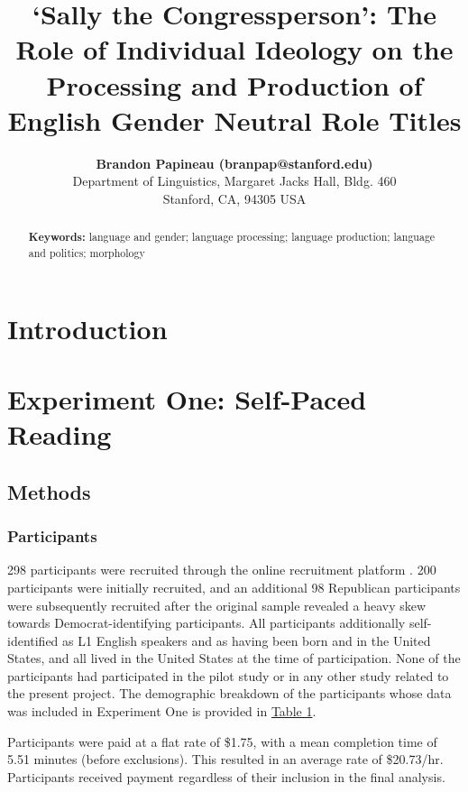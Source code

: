 \documentclass[10pt,letterpaper]{article}
\title{`Sally the Congressperson': The Role of Individual Ideology on the Processing and Production of English Gender Neutral Role Titles}
\author{{\large \bf Brandon Papineau (branpap@stanford.edu)} \\
	Department of Linguistics, Margaret Jacks Hall, Bldg. 460\\
	Stanford, CA, 94305 USA}
\begin{document}
	
	\maketitle
	
	\begin{abstract} 
		
		\textbf{Keywords:} 
		language and gender; language processing; language production; language and politics; morphology
	\end{abstract}
	
	
	\section{Introduction}
	
	\section{Experiment One: Self-Paced Reading}
	\subsection{Methods}
	\subsubsection{Participants}
	298 participants were recruited through the online recruitment platform \textcite{prolific}. 200 participants were initially recruited, and an additional 98 Republican participants were subsequently recruited after the original sample revealed a heavy skew towards Democrat-identifying participants. All participants additionally self-identified as L1 English speakers and as having been born and in the United States, and all lived in the United States at the time of participation. None of the participants had participated in the pilot study or in any other study related to the present project. The demographic breakdown of the participants whose data was included in Experiment One is provided in \hyperref[exp1-sample-table]{Table 1}.\par 
	Participants were paid at a flat rate of \$1.75, with a mean completion time of 5.51 minutes (before exclusions). This resulted in an average rate of \$20.73/hr. Participants received payment regardless of their inclusion in the final analysis.
	
\end{document}
